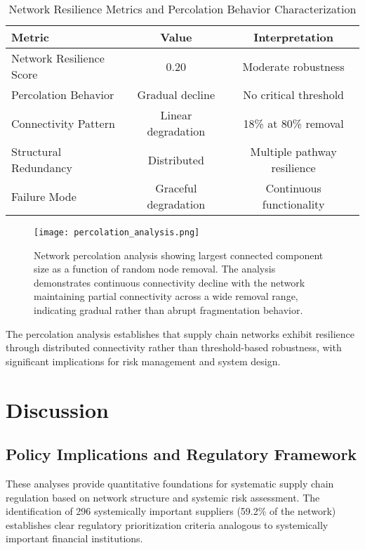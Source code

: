 \documentclass[a4 paper, 11pt,twoside]{article}
\newcommand{\0}{\Bf{0}}
\theoremstyle{definition}
\begin{document}
\begin{table}[H]
\centering
\caption{Network Resilience Metrics and Percolation Behavior Characterization}
\begin{tabular}{lcc}
\toprule
\textbf{Metric} & \textbf{Value} & \textbf{Interpretation} \\
\midrule
Network Resilience Score & 0.20 & Moderate robustness \\
Percolation Behavior & Gradual decline & No critical threshold \\
Connectivity Pattern & Linear degradation & 18\% at 80\% removal \\
Structural Redundancy & Distributed & Multiple pathway resilience \\
Failure Mode & Graceful degradation & Continuous functionality \\
\bottomrule
\end{tabular}
\end{table}

\begin{figure}[H]
\centering
\texttt{[image: percolation\_analysis.png]}
\caption{Network percolation analysis showing largest connected component size as a function of random node removal. The analysis demonstrates continuous connectivity decline with the network maintaining partial connectivity across a wide removal range, indicating gradual rather than abrupt fragmentation behavior.}
\end{figure}

The percolation analysis establishes that supply chain networks exhibit resilience through distributed connectivity rather than threshold-based robustness, with significant implications for risk management and system design.

\section{Discussion}

\subsection{Policy Implications and Regulatory Framework}

These analyses provide quantitative foundations for systematic supply chain regulation based on network structure and systemic risk assessment. The identification of 296 systemically important suppliers (59.2\% of the network) establishes clear regulatory prioritization criteria analogous to systemically important financial institutions.
\end{document}
